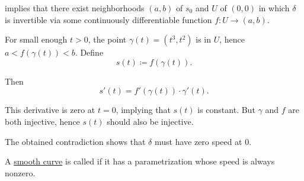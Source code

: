 \begin{example}
   implies that there exist neighborhoods \( (a, b) \) of \( s_0 \) and \( U \) of \( (0, 0) \) in which \( \delta \) is invertible via some continuously differentiable function \( f: U \to (a, b) \).

  For small enough \( t > 0 \), the point \( \gamma(t) = (t^3, t^2) \) is in \( U \), hence \( a < f(\gamma(t)) < b \). Define
  \begin{equation*}
    s(t) \coloneqq f(\gamma(t)).
  \end{equation*}

  Then
  \begin{equation*}
    s'(t) = f'(\gamma(t)) \cdot \gamma'(t).
  \end{equation*}

  This derivative is zero at \( t = 0 \), implying that \( s(t) \) is constant. But \( \gamma \) and \( f \) are both injective, hence \( s(t) \) should also be injective.

  The obtained contradiction shows that \( \delta \) must have zero speed at \( 0 \).
\end{example}

\begin{definition}\label{def:regular_curve}
  A \hyperref[def:smooth_curve]{smooth curve} is called  if it has a parametrization whose speed is always nonzero.
\end{definition}

